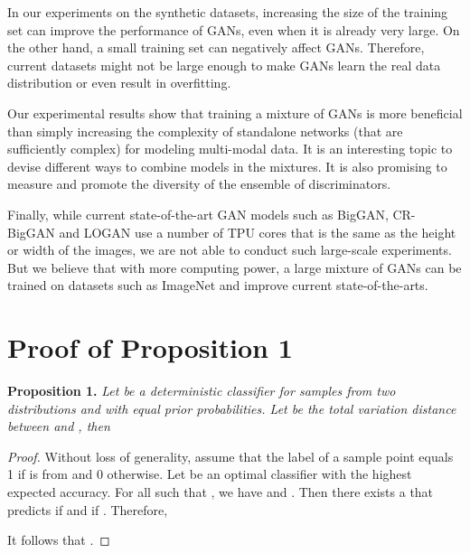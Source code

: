 \documentclass[conference]{IEEEtran}
\begin{document}
In our experiments on the synthetic datasets, increasing the size of the training set can improve the performance of GANs, even when it is already very large. On the other hand, a small training set can negatively affect GANs. Therefore, current datasets might not be large enough to make GANs learn the real data distribution or even result in overfitting.

Our experimental results show that training a mixture of GANs is more beneficial than simply increasing the complexity of standalone networks (that are sufficiently complex) for modeling multi-modal data. It is an interesting topic to devise different ways to combine models in the mixtures. It is also promising to measure and promote the diversity of the ensemble\cite{krogh1995neural,diversity} of discriminators. 

Finally, while current state-of-the-art GAN models such as BigGAN\cite{biggan}, CR-BigGAN\cite{cr-biggan} and LOGAN\cite{logan} use a number of TPU cores that is the same as the height or width of the images, we are not able to conduct such large-scale experiments. But we believe that with more computing power, a large mixture of GANs can be trained on datasets such as ImageNet  and improve current state-of-the-arts.

\appendices
\section{Proof of Proposition 1}\label{proof1}
\textbf{Proposition 1.}
\textit{
	Let  be a deterministic classifier for samples from two distributions  and  with equal prior probabilities. Let  be the total variation distance between  and , then
}

\begin{proof}
	Without loss of generality, assume that the label  of a sample point  equals 1 if  is from  and 0 otherwise. Let  be an optimal classifier with the highest expected accuracy. For all  such that , we have
	 and .
	Then there exists a  that predicts  if  and  if . Therefore,
	
	It follows that .
\end{proof}
\end{document}
